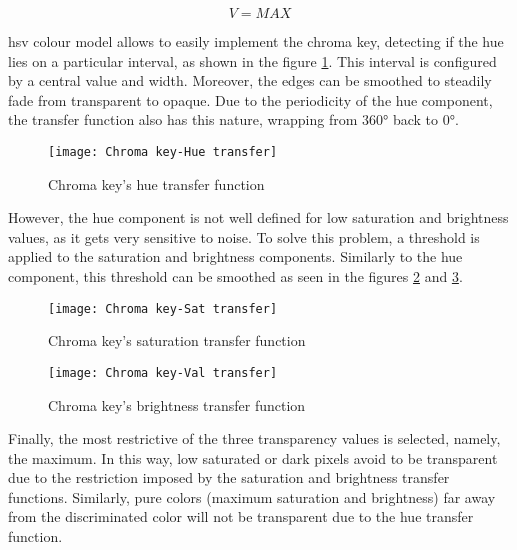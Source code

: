 \documentclass[../main.tex]{subfiles}
\begin{document}
\begin{equation}\label{eq:04:rgb2hsv_val}
    V = MAX
\end{equation}

\Gls{hsv} colour model allows to easily implement the chroma key, detecting if the hue lies on a particular interval, as shown in the figure \ref{fig:04:hue_transfer_function}. This interval is configured by a central value and width. Moreover, the edges can be smoothed to steadily fade from transparent to opaque. Due to the periodicity of the hue component, the transfer function also has this nature, wrapping from $360 \si{\degree}$ back to $0 \si{\degree}$.\newline

\begin{figure}[htbp]
    \centering
    \texttt{[image: Chroma key-Hue transfer]}

    \caption{Chroma key's hue transfer function}
    \label{fig:04:hue_transfer_function}
\end{figure}

However, the hue component is not well defined for low saturation and brightness values, as it gets very sensitive to noise. To solve this problem, a threshold is applied to the saturation and brightness components. Similarly to the hue component, this threshold can be smoothed as seen in the figures \ref{fig:04:sat_transfer_function} and \ref{fig:04:val_transfer_function}.\newline

\begin{figure}[htbp]
    \centering
    \texttt{[image: Chroma key-Sat transfer]}

    \caption{Chroma key's saturation transfer function}
    \label{fig:04:sat_transfer_function}
\end{figure}

\begin{figure}[htbp]
    \centering
    \texttt{[image: Chroma key-Val transfer]}

    \caption{Chroma key's brightness transfer function}
    \label{fig:04:val_transfer_function}
\end{figure}

Finally, the most restrictive of the three transparency values is selected, namely, the maximum. In this way, low saturated or dark \glspl{pixel} avoid to be transparent due to the restriction imposed by the saturation and brightness transfer functions. Similarly, pure colors (maximum saturation and brightness) far away from the discriminated color will not be transparent due to the hue transfer function.\newline
\end{document}
